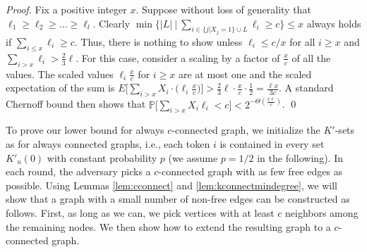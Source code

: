 \documentclass{llncs}
\renewcommand{\Pr}{\mathbb{P}}
\begin{document}
 \begin{proof}
     Fix a positive integer $x$. Suppose without loss of generality
     that $\ell_1 \geq \ell_2 \geq \ldots \geq \ell_l$. Clearly $\min
     \{|L|\ | \ \sum_{i \in \{j | X_j = 1\} \cup L} \ell_i \geq c \}
     \leq x$ always holds if $\sum_{i \leq x} \ell_i \geq c$. Thus,
     there is nothing to show unless $\ell_i \leq c/x$ for all $i \geq
     x$ and $\sum_{i>x} \ell_i > \frac{2}{3}\ell$. For this case,
     consider a scaling by a factor of $\frac{x}{c}$ of all the
     values. The scaled values $\ell_i \frac{x}{c}$ for $i \geq x$ are
     at most one and the scaled expectation of the sum is
     $E\big[\sum_{i>x} X_i \cdot\big(\ell_i \frac{x}{c}\big) \big] >
     \frac{2}{3}\ell\cdot\frac{x}{c}\cdot\frac{1}{2}=\frac{\ell
         x}{3c}$. A standard Chernoff bound then shows that $\Pr\big[
     \sum_{i>x} X_i \ell_i < c \big] < 2^{-\Theta(\frac{x\ell}{c})}$.
 \hspace*{\fill}\qed\end{proof}

To prove our lower bound for always $c$-connected graph, we initialize
the $K'$-sets as for always connected graphs, i.e., each token $i$ is
contained in every set $K'_u(0)$ with constant probability $p$ (we
assume $p=1/2$ in the following). In each
round, the adversary picks a $c$-connected graph with as few free
edges as possible. Using Lemmas \ref{lem:cconnect} and
\ref{lem:kconnectmindegree}, we will show that a graph with a small
number of non-free edges can be constructed as follows. First, as long
as we can, we pick vertices with at least $c$ neighbors among the
remaining nodes. We then show how to extend the resulting graph to a
$c$-connected graph.
\end{document}

